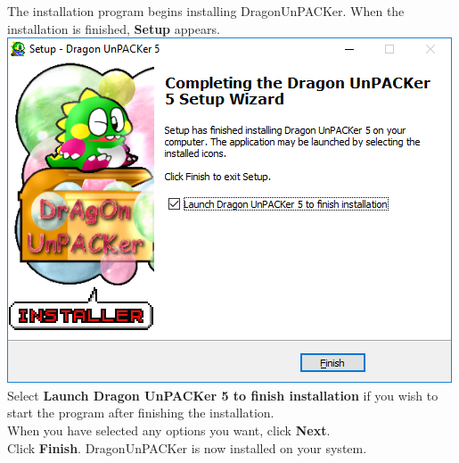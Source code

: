 \documentclass[10pt,a4paper,twoside]{book}
\makeatletter
\def\maxwidth#1{\ifdim\Gin@nat@width>#1 #1\else\Gin@nat@width\fi}
\makeatother
\begin{document}
\begin{enumerate}
\begin{minipage}{\linewidth}
\item The installation program begins installing DragonUnPACKer. When the installation is finished, \textbf{Setup} appears.\\
\includegraphics[width=\maxwidth{9cm}]{install/009-finish}\\
Select \textbf{Launch Dragon UnPACKer 5 to finish installation} if you wish to start the program after finishing the installation.\\
When you have selected any options you want, click \textbf{Next}.\\
Click \textbf{Finish}. DragonUnPACKer is now installed on your system.\\
\end{minipage}
\end{enumerate}

\end{document}
